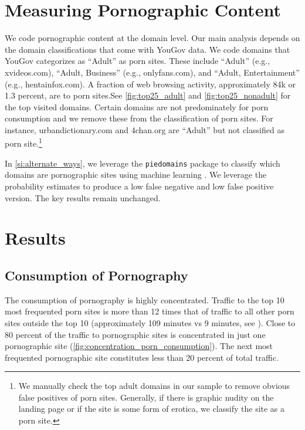 \documentclass[12pt, letterpaper]{article}
\begin{document}
\section*{Measuring Pornographic Content}
We code pornographic content at the domain level. Our main analysis depends on the domain classifications that come with YouGov data. We code domains that YouGov categorizes as ``Adult'' as porn sites. These include ``Adult'' (e.g., xvideos.com), ``Adult, Business'' (e.g., onlyfans.com), and ``Adult, Entertainment'' (e.g., hentainfox.com). A fraction of web browsing activity, approximately 84k or 1.3 percent, are to porn sites.See \cref{fig:top25_adult} and \cref{fig:top25_nonadult} for the top visited domains. Certain domains are not predominately for porn consumption and we remove these from the classification of porn sites. For instance, urbandictionary.com and 4chan.org are ``Adult'' but not classified as porn site.\footnote{We manually check the top adult domains in our sample to remove obvious false positives of porn sites. Generally, if there is graphic nudity on the landing page or if the site is some form of erotica, we classify the site as a porn site.}

In \ref{si:alternate_ways}, we leverage the \texttt{piedomains} package to classify which domains are pornographic sites using machine learning \citep{Chintalapati_piedomains_Predict_the_2022}. We leverage the probability estimates to produce a low false negative and low false positive version. The key results remain unchanged. 

\section*{Results}

\subsection*{Consumption of Pornography}
The consumption of pornography is highly concentrated. Traffic to the top 10 most frequented porn sites is more than 12 times that of traffic to all other porn sites outside the top 10 (approximately 109 minutes vs 9 minutes, see ). Close to 80 percent of the traffic to pornographic sites is concentrated in just one pornographic site (\cref{fig:concentration_porn_consumption}).  The next most frequented pornographic site constitutes less than 20 percent of total traffic.
\end{document}
